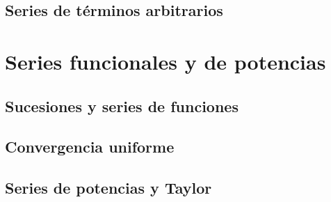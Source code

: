 \documentclass{article}
\begin{document}
\subsection{Series de términos arbitrarios}





\section{Series funcionales y de potencias}

\subsection{Sucesiones y series de funciones}

\subsection{Convergencia uniforme}

\subsection{Series de potencias y Taylor}
\end{document}
